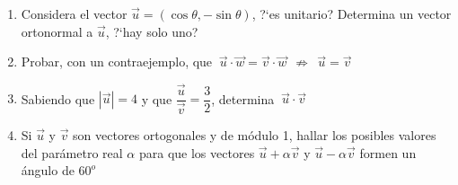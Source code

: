 \vspace{5mm}
\begin{enumerate}


\item	Considera el vector $\vec u=(\cos \theta,-\sin \theta)$, ?`es unitario? Determina un vector ortonormal a $\vec u$, ?`hay solo uno?

\vspace{-6mm}
\begin{flushright}
\begin{footnotesize} \textcolor{gris}{}	\end{footnotesize}
\end{flushright}


\item	Probar, con un contraejemplo, que $\ \vec u \cdot \vec w = \vec v \cdot \vec w \ \ \not \Rightarrow \ \ \vec u = \vec v$

\vspace{-6mm}
\begin{flushright}
\begin{footnotesize} \textcolor{gris}{}	\end{footnotesize}
\end{flushright}


\item	Sabiendo que $|\vec u|=4$ y que $\dfrac{\vec u}{\vec v}=\dfrac 3 2 $, determina $\ \vec u \cdot \vec v$

\vspace{-6mm}
\begin{flushright}
\begin{footnotesize} \textcolor{gris}{}	\end{footnotesize}
\end{flushright}


\item	Si $\vec u$ y $\vec v$ son vectores ortogonales y de módulo 1, hallar los posibles valores del parámetro real $\alpha$ para que los vectores $\vec u+\alpha \vec v$ y $\vec u-\alpha \vec v$ formen un ángulo de $60^o$

\vspace{-6mm}
\begin{flushright}
\begin{footnotesize} \textcolor{gris}{}	\end{footnotesize}
\end{flushright}





\end{enumerate}
